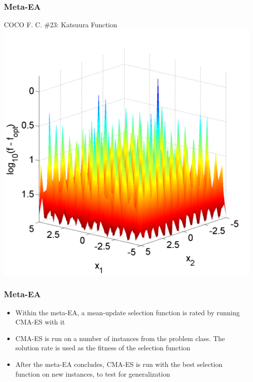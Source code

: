 \documentclass{beamer}
\begin{document}
\begin{frame}
\centering	
\frametitle{Meta-EA}
COCO F. C. \#23: Katsuura Function
\includegraphics[height=0.8\textheight]{katsuura_landscape}
\end{frame}	

	\begin{frame}
		\frametitle{Meta-EA}
		
		\begin{itemize}
			\item<1-|alert@1> Within the meta-EA, a mean-update selection function is rated by running CMA-ES with it
			\item<2-|alert@2> CMA-ES is run on a number of instances from the problem class. The solution rate is used as the fitness of the selection function
			\item<3-|alert@3> After the meta-EA concludes, CMA-ES is run with the best selection function on new instances, to test for generalization
		\end{itemize}
	\end{frame}
\end{document}
